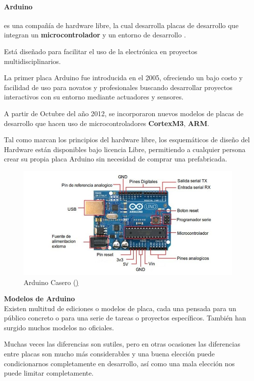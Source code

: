 \bigskip
\paragraph{Arduino} es una compañía de hardware libre, la cual desarrolla placas de desarrollo que integran un \textbf{microcontrolador} y un entorno de desarrollo  \cite{IDE}.

\bigskip
Está diseñado para facilitar el uso de la electrónica en proyectos multidisciplinarios\cite{ARDUINO}.

\bigskip
La primer placa Arduino fue introducida en el 2005, ofreciendo un bajo costo y facilidad de uso para novatos y profesionales buscando desarrollar proyectos interactivos con su entorno mediante actuadores y sensores.

\bigskip
A partir de Octubre del año 2012, se incorporaron nuevos modelos de placas de desarrollo que hacen uso de microcontroladores \textbf{CortexM3}, \textbf{ARM}.

\bigskip
Tal como marcan los principios del hardware libre, los esquemáticos de diseño del Hardware están disponibles bajo licencia Libre, permitiendo a cualquier persona crear su propia placa Arduino sin necesidad de comprar una prefabricada. 


\begin{figure}[h]
	\centering
	\includegraphics[width=0.7\linewidth]{../images/caracteristicas_arduino}
	\caption[Arduino Casero]{Arduino Casero (\href{http://www.cerosecurity.com/como-construir-un-arduino-casero/})}
	\label{fig:arduinocasero}
\end{figure}


\textbf{Modelos de Arduino}  \\

Existen multitud de ediciones o modelos de placa, cada una pensada para un público concreto o para una serie de tareas o proyectos específicos. También han surgido muchos modelos no oficiales. 

\bigskip
Muchas veces las diferencias son sutiles, pero en otras ocasiones las diferencias entre placas son mucho más considerables y una buena elección puede condicionarnos completamente en desarrollo, así como una mala elección nos puede limitar completamente. 

